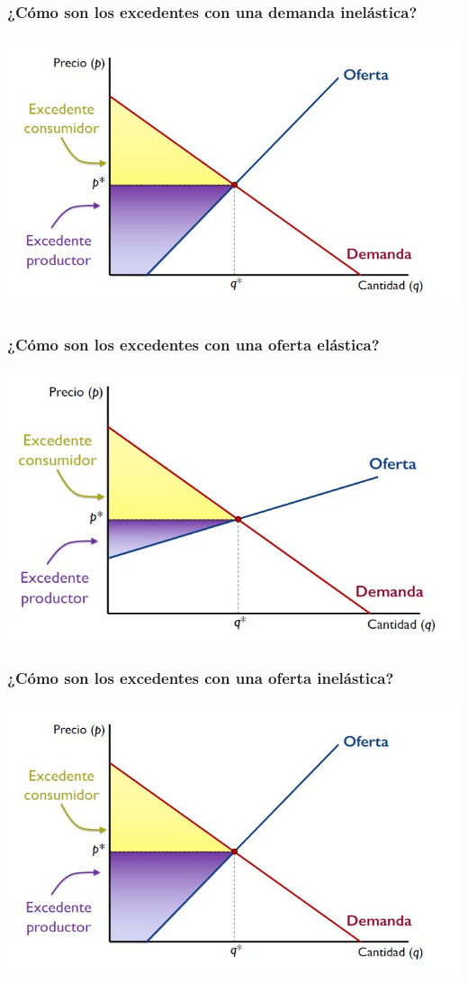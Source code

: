 \documentclass{beamer}
\begin{document}
\begin{frame}
\frametitle{ ¿Cómo son los excedentes con una demanda inelástica?}
\includegraphics[scale=0.6]{Figures/Tema_07.25_equilibrioyexcedente3.jpg}
\end{frame}

\begin{frame}
\frametitle{¿Cómo son los excedentes con una oferta elástica?}
\includegraphics[scale=0.6]{Figures/Tema_07.26_equilibrioyexcedente4.jpg}
\end{frame}

\begin{frame}
\frametitle{ ¿Cómo son los excedentes con una oferta inelástica?}
\includegraphics[scale=0.55]{Figures/Tema_07.25_equilibrioyexcedente3.jpg}
\end{frame}
\end{document}
